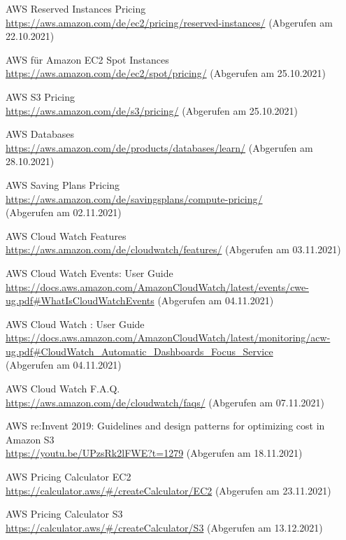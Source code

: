 \begin{thebibliography}{HR08}
  AWS Reserved Instances Pricing\\
  \url{https://aws.amazon.com/de/ec2/pricing/reserved-instances/}
  (Abgerufen am 22.10.2021)

   AWS für Amazon EC2 Spot Instances\\
  \url{https://aws.amazon.com/de/ec2/spot/pricing/}
  (Abgerufen am 25.10.2021)

   AWS S3 Pricing\\
  \url{https://aws.amazon.com/de/s3/pricing/}
  (Abgerufen am 25.10.2021)

   AWS Databases\\
  \url{https://aws.amazon.com/de/products/databases/learn/}
  (Abgerufen am 28.10.2021)

   AWS Saving Plans Pricing\\
  \url{https://aws.amazon.com/de/savingsplans/compute-pricing/}\\
  (Abgerufen am 02.11.2021)

   AWS Cloud Watch Features\\
  \url{https://aws.amazon.com/de/cloudwatch/features/}
  (Abgerufen am 03.11.2021)


   AWS Cloud Watch Events: User Guide\\
  \url{https://docs.aws.amazon.com/AmazonCloudWatch/latest/events/cwe-ug.pdf#WhatIsCloudWatchEvents}
  (Abgerufen am 04.11.2021)

 AWS Cloud Watch : User Guide\\
  \url{https://docs.aws.amazon.com/AmazonCloudWatch/latest/monitoring/acw-ug.pdf#CloudWatch_Automatic_Dashboards_Focus_Service}
  \\(Abgerufen am 04.11.2021)

 AWS Cloud Watch F.A.Q.\\
  \url{https://aws.amazon.com/de/cloudwatch/faqs/}
  (Abgerufen am 07.11.2021)

 AWS re:Invent 2019: Guidelines and design patterns for optimizing cost in Amazon S3\\
  \url{https://youtu.be/UPzsRk2lFWE?t=1279}
  (Abgerufen am 18.11.2021)

 AWS Pricing Calculator EC2\\
  \url{https://calculator.aws/#/createCalculator/EC2}
  (Abgerufen am 23.11.2021)
  
 AWS Pricing Calculator S3\\
  \url{https://calculator.aws/#/createCalculator/S3}
  (Abgerufen am 13.12.2021)  


\end{thebibliography}
